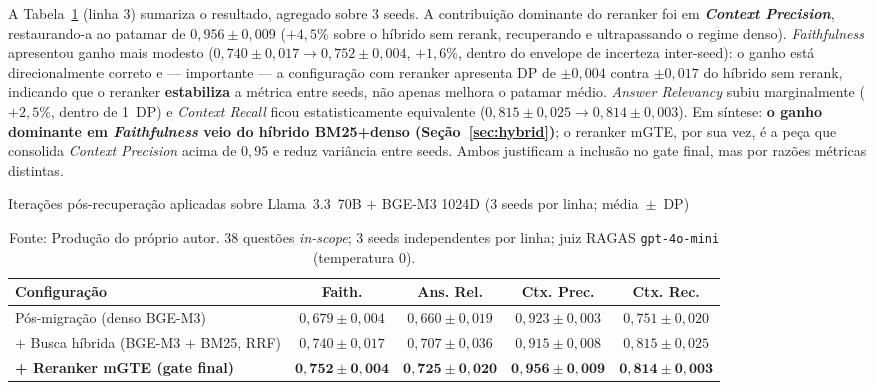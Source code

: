 \documentclass[
  12pt,
  oneside,
  a4paper,
  english,
  brazil
]{abntex2}
\begin{document}
A Tabela~\ref{tab:hybrid-rerank} (linha 3) sumariza o resultado, agregado sobre
3 seeds. A contribuição dominante do reranker foi em
\textbf{\textit{Context Precision}}, restaurando-a ao patamar de $0{,}956
\pm 0{,}009$ ($+4{,}5\%$ sobre o híbrido sem rerank, recuperando e
ultrapassando o regime denso). \textit{Faithfulness} apresentou
ganho mais modesto ($0{,}740 \pm 0{,}017 \to 0{,}752 \pm 0{,}004$, $+1{,}6\%$,
dentro do envelope de incerteza inter-seed): o ganho está direcionalmente
correto e --- importante --- a configuração com reranker apresenta DP de
$\pm 0{,}004$ contra $\pm 0{,}017$ do híbrido sem rerank, indicando que o
reranker \textbf{estabiliza} a métrica entre seeds, não apenas melhora o
patamar médio. \textit{Answer Relevancy} subiu marginalmente ($+2{,}5\%$,
dentro de 1~DP) e \textit{Context Recall} ficou estatisticamente equivalente
($0{,}815 \pm 0{,}025 \to 0{,}814 \pm 0{,}003$). Em síntese:
\textbf{o ganho dominante em \textit{Faithfulness} veio do híbrido BM25+denso
(Seção~\ref{sec:hybrid})}; o reranker mGTE, por sua vez, é a peça que
consolida \textit{Context Precision} acima de $0{,}95$ e reduz variância
entre seeds. Ambos justificam a inclusão no gate final, mas por razões
métricas distintas.

\begin{table}[ht]
  \caption{Iterações pós-recuperação aplicadas sobre Llama~3.3~70B + BGE-M3
           1024D (3 seeds por linha; média~$\pm$~DP)}
  \label{tab:hybrid-rerank}
  \begin{tabularx}{\textwidth}{@{}Xcccc@{}}
  \toprule
  \textbf{Configuração} & \textbf{Faith.} & \textbf{Ans. Rel.} &
  \textbf{Ctx. Prec.} & \textbf{Ctx. Rec.} \\
  \midrule
  Pós-migração (denso BGE-M3)         & $0{,}679 \pm 0{,}004$ & $0{,}660 \pm 0{,}019$ & $0{,}923 \pm 0{,}003$ & $0{,}751 \pm 0{,}020$ \\
  + Busca híbrida (BGE-M3 + BM25, RRF) & $0{,}740 \pm 0{,}017$ & $0{,}707 \pm 0{,}036$ & $0{,}915 \pm 0{,}008$ & $0{,}815 \pm 0{,}025$ \\
  \textbf{+ Reranker mGTE (gate final)}
        & $\mathbf{0{,}752 \pm 0{,}004}$ & $\mathbf{0{,}725 \pm 0{,}020}$ & $\mathbf{0{,}956 \pm 0{,}009}$ & $\mathbf{0{,}814 \pm 0{,}003}$ \\
  \bottomrule
  \end{tabularx}
  \caption*{Fonte: Produção do próprio autor. 38 questões \textit{in-scope};
            3 seeds independentes por linha; juiz RAGAS \texttt{gpt-4o-mini}
            (temperatura 0).}
\end{table}
\end{document}
